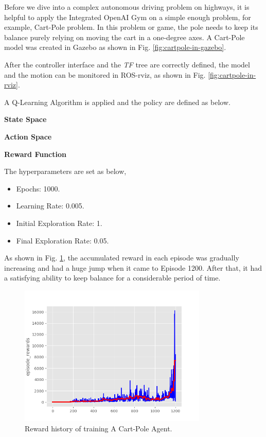 Before we dive into a complex autonomous driving problem on highways, it is helpful to apply the Integrated OpenAI Gym on a simple enough problem, for example, Cart-Pole problem. In this problem or game, the pole needs to keep its balance purely relying on moving the cart in a one-degree axes. A Cart-Pole model was created in Gazebo as shown in Fig. \ref{fig:cartpole-in-gazebo}. 

After the controller interface and the \textit{TF} tree are correctly defined, the model and the motion can be monitored in ROS-rviz, as shown in Fig. \ref{fig:cartpole-in-rviz}. 

A Q-Learning Algorithm is applied and the policy are defined as below.

\textbf{State Space}

\textbf{Action Space}

\textbf{Reward Function}

The hyperparameters are set as below,

\begin{itemize}
\item{Epochs:} 1000.
\item{Learning Rate:} 0.005.
\item{Initial Exploration Rate:} 1.
\item{Final Exploration Rate:} 0.05.
\end{itemize}

As shown in Fig. \ref{fig:cartpole-result}, the accumulated reward in each episode was gradually increasing and had a huge jump when it came to Episode 1200. After that, it had a satisfying ability to keep balance for a considerable period of time.

\begin{figure}[h]
\centering
\includegraphics[width=0.8\textwidth]{figs/ch2/cartpole-epoch-1200}
\caption{Reward history of training A Cart-Pole Agent.}
\label{fig:cartpole-result}
\end{figure}

